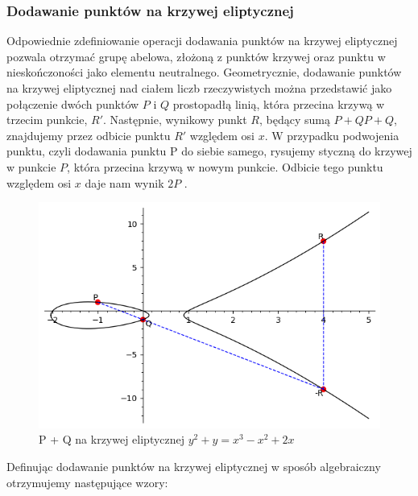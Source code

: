 \subsubsection{Dodawanie punktów na krzywej eliptycznej}
Odpowiednie zdefiniowanie operacji dodawania punktów na krzywej eliptycznej
pozwala otrzymać grupę abelowa, złożoną z punktów krzywej oraz punktu w nieskończoności jako
elementu neutralnego.
\newline
\indent
Geometrycznie, dodawanie punktów na krzywej eliptycznej nad ciałem liczb rzeczywistych można przedstawić
jako połączenie dwóch punktów $P$ i $Q$ prostopadłą linią, która przecina krzywą w trzecim
punkcie, $R'$. Następnie, wynikowy punkt $R$, będący sumą $P+QP+Q$, znajdujemy przez
odbicie punktu $R'$ względem osi $x$. W przypadku podwojenia punktu, czyli dodawania
punktu P do siebie samego, rysujemy styczną do krzywej w punkcie $P$, która przecina
krzywą w nowym punkcie. Odbicie tego punktu względem osi $x$ daje nam wynik $2P$ \cite{Chrzeszczyk2010}\cite{Stinson2021}.
\begin{figure}[!h]
    \centering \includegraphics[width=0.8\linewidth]{sage/elliptic_rational_point_addition.png}
    \caption{P + Q na krzywej eliptycznej $y^2+y=x^3-x^2+2x$}
\end{figure}
\par
Definując dodawanie punktów na krzywej eliptycznej w sposób algebraiczny otrzymujemy następujące wzory:

